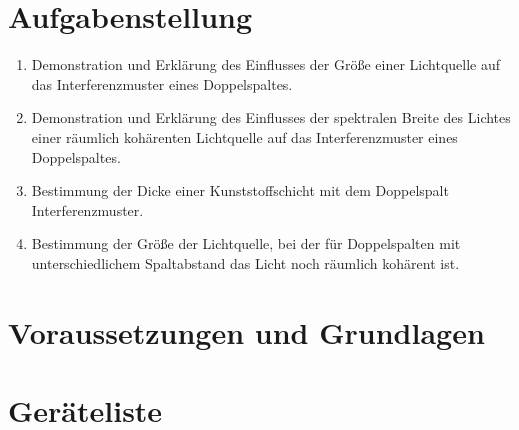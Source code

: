 \documentclass{article}
\begin{document}
\parindent0cm




\pagestyle{fancy}

\section{Aufgabenstellung}

\begin{enumerate}
\item Demonstration und Erklärung des Einflusses der Größe einer Lichtquelle auf das Interferenzmuster eines Doppelspaltes.
\item Demonstration und Erklärung des Einflusses der spektralen Breite des Lichtes einer räumlich kohärenten Lichtquelle auf das Interferenzmuster eines Doppelspaltes.
\item Bestimmung der Dicke einer Kunststoffschicht mit dem Doppelspalt Interferenzmuster.
\item Bestimmung der Größe der Lichtquelle, bei der für Doppelspalten mit unterschiedlichem Spaltabstand das Licht noch räumlich kohärent ist.
\end{enumerate}



\section{Voraussetzungen und Grundlagen}






\section{Geräteliste}
\end{document}

